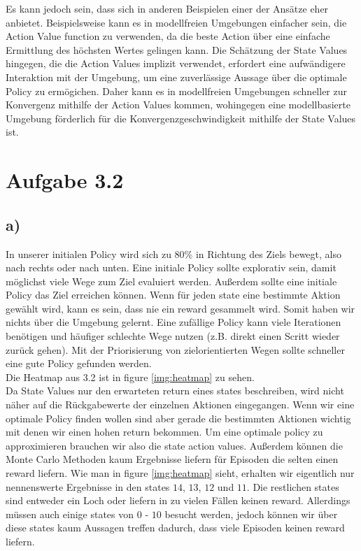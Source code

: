 \documentclass[11pt]{article}
\begin{document}
Es kann jedoch sein, dass sich in anderen Beispielen einer der Ansätze eher anbietet. Beispielsweise kann es in modellfreien Umgebungen einfacher sein, die Action Value function zu verwenden, da die beste Action über eine einfache Ermittlung des höchsten Wertes gelingen kann. Die Schätzung der State Values hingegen, die die Action Values implizit verwendet, erfordert eine aufwändigere Interaktion mit der Umgebung, um eine zuverlässige Aussage über die optimale Policy zu ermögichen. Daher kann es in modellfreien Umgebungen schneller zur Konvergenz mithilfe der Action Values kommen, wohingegen eine modellbasierte Umgebung förderlich für die Konvergenzgeschwindigkeit mithilfe der State Values ist.

\section*{Aufgabe 3.2}

\subsection*{a)}
In unserer initialen Policy wird sich zu 80\% in Richtung des Ziels bewegt, also nach rechts oder nach unten.
Eine initiale Policy sollte explorativ sein, damit möglichst viele Wege zum Ziel evaluiert werden.
Außerdem sollte eine initiale Policy das Ziel erreichen können. Wenn für jeden state eine bestimmte Aktion gewählt wird, kann es sein, dass nie ein reward gesammelt wird. Somit haben wir nichts über die Umgebung gelernt.
Eine zufällige Policy kann viele Iterationen benötigen und häufiger schlechte Wege nutzen (z.B. direkt einen Scritt wieder zurück gehen).
Mit der Priorisierung von zielorientierten Wegen sollte schneller eine gute Policy gefunden werden. \\

Die Heatmap aus 3.2 ist in figure \ref{img:heatmap} zu sehen. \\

Da State Values nur den erwarteten return eines states beschreiben, wird nicht näher auf die Rückgabewerte der einzelnen Aktionen eingegangen.
Wenn wir eine optimale Policy finden wollen sind aber gerade die bestimmten Aktionen wichtig mit denen wir einen hohen return bekommen.
Um eine optimale policy zu approximieren brauchen wir also die state action values.
Außerdem können die Monte Carlo Methoden kaum Ergebnisse liefern für Episoden die selten einen reward liefern.
Wie man in figure \ref{img:heatmap} sieht, erhalten wir eigentlich nur nennenswerte Ergebnisse in den states $14$, $13$, $12$ und $11$.
Die restlichen states sind entweder ein Loch oder liefern in zu vielen Fällen keinen reward. Allerdings müssen auch einige states von $0$ - $10$ besucht werden,
jedoch können wir über diese states kaum Aussagen treffen dadurch, dass viele Episoden keinen reward liefern.
\end{document}
